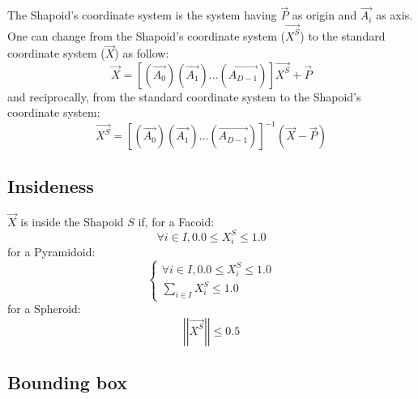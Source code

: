 The Shapoid's coordinate system is the system having $\overrightarrow{P}$ as origin and $\overrightarrow{A_i}$ as axis. One can change from the Shapoid's coordinate system ($\overrightarrow{X^S}$) to the standard coordinate system ($\overrightarrow{X}$) as follow:\\
\begin{equation}
\overrightarrow{X}=\left[\left(\overrightarrow{A_0}\right)\left(\overrightarrow{A_1}\right)...\left(\overrightarrow{A_{D-1}}\right)\right]\overrightarrow{X^S}+\overrightarrow{P}
\end{equation}
and reciprocally, from the standard coordinate system to the Shapoid's coordinate system:\\
\begin{equation}
\overrightarrow{X^S}=\left[\left(\overrightarrow{A_0}\right)\left(\overrightarrow{A_1}\right)...\left(\overrightarrow{A_{D-1}}\right)\right]^{-1}\left(\overrightarrow{X}-\overrightarrow{P}\right)
\end{equation}

\subsection{Insideness}

$\overrightarrow{X}$ is inside the Shapoid $S$ if, for a Facoid:\\
\begin{equation}
\forall i\in I,0.0\le X_i^S\le1.0
\end{equation}
for a Pyramidoid:\\
\begin{equation}
\left\lbrace\begin{array}{l}
\forall i\in I,0.0\le X_i^S\le1.0\\
\sum_{i\in I}X_i^S\le1.0
\end{array}\right.
\end{equation}
for a Spheroid:\\
\begin{equation}
\left|\left|\overrightarrow{X^S}\right|\right|\le0.5
\end{equation}

\subsection{Bounding box}

